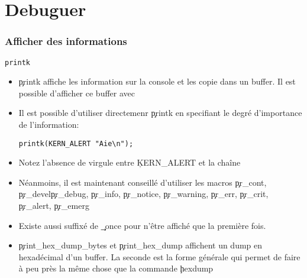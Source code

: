 %
%
%

\part{Debuguer}

\begin{frame}
  \partpage
\end{frame}

\begin{frame}
  \tableofcontents[currentpart]
\end{frame}

\section{Afficher des informations}

\begin{frame}[fragile=singleslide]{\texttt{printk}}
  \begin{itemize} 
  \item \c{printk} affiche les information sur la console et les copie
    dans  un  buffer.   Il  est  possible d'afficher  ce  buffer  avec
  \item   Il  est  possible   d'utiliser  directemenr   \c{printk}  en
    specifiant le degré d'importance de l'information:
    \begin{lstlisting} 
printk(KERN_ALERT "Aie\n");
    \end{lstlisting} 
  \item Notez l'absence de virgule entre \c{KERN_ALERT} et la chaîne
  \item Néanmoins,  il est maintenant conseillé  d'utiliser les macros
    \c{pr_cont}, \c{pr_devel}\c{pr_debug}, \c{pr_info}, \c{pr_notice},
    \c{pr_warning},     \c{pr_err},     \c{pr_crit},     \c{pr_alert},
    \c{pr_emerg}
  \item Existe aussi  suffixé de \c{_once} pour n'être  affiché que la
    première fois.
  \item  \c{print_hex_dump_bytes} et  \c{print_hex_dump}  affichent un
    dump en hexadécimal d'un buffer.  La seconde est la forme générale
    qui  permet de  faire à  peu près  la même  chose que  la commande
    \c{hexdump}
  \end{itemize}
\end{frame}

